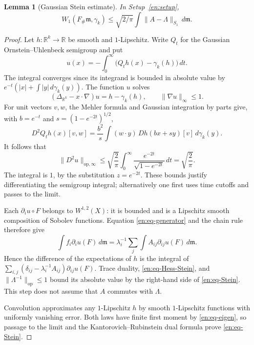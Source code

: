\documentclass[12pt]{amsart}
\newtheorem{lem}[thm]{Lemma}
\theoremstyle{definition}
\theoremstyle{remark}
\numberwithin{equation}{section}
\newcommand{\R}{\mathbb{R}}
\newcommand{\m}{\mathfrak m}
\theoremstyle{jpplain}
\begin{document}
\begin{lem}[Gaussian Stein estimate]\label{en:lem-Stein}
In Setup~\ref{en:setup},
\begin{equation}\label{en:eq-Stein}
 W_1(F_\#\m,\gamma_k)
 \leq\sqrt{2/\pi}\int\|A-\Lambda\|_{S_1}\,d\m.
\end{equation}
\end{lem}
\begin{proof}
Let $h:\R^k\to\R$ be smooth and $1$-Lipschitz.  Write $Q_t$ for the
Gaussian Ornstein--Uhlenbeck semigroup and put
\[
 u(x)=-\int_0^\infty\bigl(Q_th(x)-\gamma_k(h)\bigr)\,dt.
\]
The integral converges since its integrand is bounded in absolute value by
$e^{-t}(|x|+\int|y|\,d\gamma_k(y))$.  The function $u$ solves
\[
 (\Delta_{\R^k}-x\cdot\nabla)u=h-\gamma_k(h),\qquad
 \|\nabla u\|_\infty\leq1.
\]
For unit vectors $v,w$, the Mehler formula and Gaussian integration by parts
give, with $b=e^{-t}$ and $s=(1-e^{-2t})^{1/2}$,
\[
 D^2Q_th(x)[v,w]
 =\frac{b^2}{s}\int(w\cdot y)\,Dh(bx+sy)[v]\,d\gamma_k(y).
\]
It follows that
\begin{equation}\label{en:eq-Hess-Stein}
 \|D^2u\|_{\mathrm{op},\infty}
 \leq\sqrt{\frac2\pi}
       \int_0^\infty\frac{e^{-2t}}{\sqrt{1-e^{-2t}}}\,dt
 =\sqrt{\frac2\pi}.
\end{equation}
The integral is $1$, by the substitution $z=e^{-2t}$.
These bounds justify differentiating the semigroup integral; alternatively
one first uses time cutoffs and passes to the limit.

Each $\partial_i u\circ F$ belongs to $W^{1,2}(X)$: it is bounded and is
a Lipschitz smooth composition of Sobolev functions.  Equation
\eqref{en:eq-generator} and the chain rule therefore give
\begin{equation}\label{en:eq-IBP-Stein}
 \int f_i\partial_i u(F)\,d\m
 =\lambda_i^{-1}\sum_j\int A_{ij}\partial_{ij}u(F)\,d\m.
\end{equation}
Hence the difference of the expectations of $h$ is the integral of
$\sum_{i,j}(\delta_{ij}-\lambda_i^{-1}A_{ij})\partial_{ij}u(F)$.
Trace duality, \eqref{en:eq-Hess-Stein}, and
$\|\Lambda^{-1}\|_{\mathrm{op}}\leq1$ bound its absolute value by the
right-hand side of \eqref{en:eq-Stein}.  This step does not assume that
$A$ commutes with $\Lambda$.

Convolution approximates any $1$-Lipschitz $h$ by smooth $1$-Lipschitz
functions with uniformly vanishing error.  Both laws have finite first
moment by \eqref{en:eq-eigen}, so passage to the limit and the
Kantorovich--Rubinstein dual formula prove \eqref{en:eq-Stein}.
\end{proof}
\end{document}
